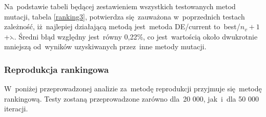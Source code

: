 \begin{itemize}
Na~podstawie tabeli będącej zestawieniem wszystkich testowanych metod mutacji, tabela \ref{ranking3}, potwierdza się~zauważona w~poprzednich testach zależność, iż~najlepiej działającą metodą jest~metoda DE/current to~best/$n_{v}+1$+$\leftthreetimes$. Średni błąd względny jest~równy 0,22\%, co jest~wartością około dwukrotnie mniejszą od~wyników uzyskiwanych przez~inne metody mutacji.

\end{itemize}



\subsubsection{Reprodukcja rankingowa}
W~poniżej przeprowadzonej analizie za~metodę reprodukcji przyjmuje się~metodę rankingową. Testy zostaną przeprowadzone zarówno dla~20 000, jak~i~dla 50 000 iteracji.\\
\par
